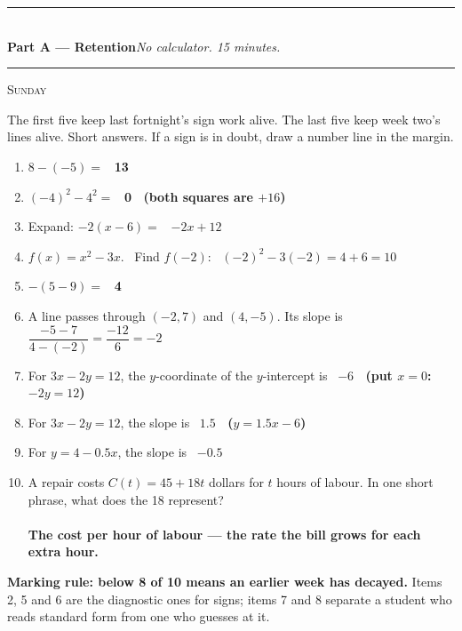\documentclass[11pt,a4paper]{article}
\newif\ifANSWERS
\newcommand{\PartHead}[2]{%
  \vspace{6pt}
  {\color{navy}\rule{\textwidth}{0.8pt}}\\[2pt]
  {\large\bfseries\color{navy}#1}\hfill{\small\itshape #2}\\[-4pt]
  {\color{navy}\rule{\textwidth}{0.4pt}}
  \vspace{4pt}
}
\newcommand{\sitting}[1]{{\footnotesize\textsc{\color{navy}#1}}\par\vspace{2pt}}
\newcommand{\ans}[1]{\ {\color{keyred}\bfseries #1}}
\newcommand{\note}[1]{\par{\footnotesize\color{keyred}#1}}
\newcommand{\ans}[1]{}
\newcommand{\note}[1]{}
\begin{document}
\PartHead{Part A --- Retention}{No calculator. 15 minutes.}
\sitting{Sunday}
The first five keep last fortnight's sign work alive. The last five keep week two's
lines alive. Short answers. If a sign is in doubt, draw a number line in the margin.

\begin{enumerate}[leftmargin=20pt,itemsep=7pt]
\item $8-(-5)=$ \ifANSWERS\else\underline{\hspace{2cm}}\fi \ans{13}
\item $(-4)^2-4^2=$ \ifANSWERS\else\underline{\hspace{2cm}}\fi \ans{0 \ (both squares are $+16$)}
\item Expand: $-2(x-6)=$ \ifANSWERS\else\underline{\hspace{4cm}}\fi \ans{$-2x+12$}
\item $f(x)=x^2-3x$. \ Find $f(-2)$: \ifANSWERS\else\underline{\hspace{2cm}}\fi \ans{$(-2)^2-3(-2)=4+6=10$}
\item $-(5-9)=$ \ifANSWERS\else\underline{\hspace{2cm}}\fi \ans{4}
\item A line passes through $(-2,7)$ and $(4,-5)$. Its slope is \ifANSWERS\else\underline{\hspace{2cm}}\fi \ans{$\dfrac{-5-7}{4-(-2)}=\dfrac{-12}{6}=-2$}
\item For $3x-2y=12$, the $y$-coordinate of the $y$-intercept is \ifANSWERS\else\underline{\hspace{2cm}}\fi \ans{$-6$ \ (put $x=0$: $-2y=12$)}
\item For $3x-2y=12$, the slope is \ifANSWERS\else\underline{\hspace{2cm}}\fi \ans{$1.5$ \ ($y=1.5x-6$)}
\item For $y=4-0.5x$, the slope is \ifANSWERS\else\underline{\hspace{2cm}}\fi \ans{$-0.5$}
\item A repair costs $C(t)=45+18t$ dollars for $t$ hours of labour. In one short phrase, what does the 18 represent?\ifANSWERS\else\\
  \underline{\hspace{\linewidth}}\fi
  \ans{\\ The cost per hour of labour --- the rate the bill grows for each extra hour.}
\end{enumerate}

\note{\textbf{Marking rule: below 8 of 10 means an earlier week has decayed.} Items 2, 5 and 6 are the diagnostic ones for signs; items 7 and 8 separate a student who reads standard form from one who guesses at it.}
\end{document}
